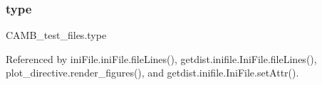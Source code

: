 \mbox{\label{namespaceCAMB__test__files_a8edfea438971669fea3e0775bd14263a}} 
\subsubsection{\texorpdfstring{type}{type}}
{\footnotesize\ttfamily C\+A\+M\+B\+\_\+test\+\_\+files.\+type}



Referenced by ini\+File.\+ini\+File.\+file\+Lines(), getdist.\+inifile.\+Ini\+File.\+file\+Lines(), plot\+\_\+directive.\+render\+\_\+figures(), and getdist.\+inifile.\+Ini\+File.\+set\+Attr().

